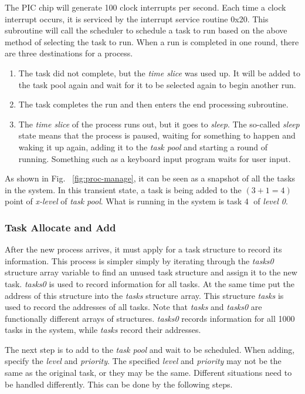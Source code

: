\documentclass{swfcthesis}
\begin{document}
The PIC chip will generate 100 clock interrupts per second. Each time a clock interrupt
occurs, it is serviced by the interrupt service routine 0x20. This subroutine will call
the scheduler to schedule a task to run based on the above method of selecting the task to
run. When a run is completed in one round, there are three destinations for a process.
\begin{enumerate}
\item The task did not complete, but the \emph{time slice} was used up. It will be added
  to the task pool again and wait for it to be selected again to begin another run.
\item The task completes the run and then enters the end processing subroutine.
\item The \emph{time slice} of the process runs out, but it goes to \emph{sleep}. The
  so-called \emph{sleep} state means that the process is paused, waiting for something to
  happen and waking it up again, adding it to the \emph{task pool} and starting a round of
  running. Something such as a keyboard input program waits for user input.
  
\end{enumerate}

As shown in Fig. ~\ref{fig:proc-manage}, it can be seen as a snapshot of all the tasks in
the system. In this transient state, a task is being added to the $(3+1=4)$ point of
\emph{x-level} of \emph{task pool}. What is running in the system is task \textcircled{4}
of \emph{level 0}. 


\subsubsection{Task Allocate and Add}
\label{sec:task-allocate-add}
After the new process arrives, it must apply for a task structure to record its
information. This process is simpler simply by iterating through the \emph{tasks0} structure array
variable to find an unused task structure and assign it to the new task. \emph{tasks0} is
used to record information for all tasks. At the same time put the address of this
structure into the \emph{tasks} structure array. This structure \emph{tasks} is used to
record the addresses of all tasks. Note that \emph{tasks} and \emph{tasks0} are
functionally different arrays of structures. \emph{tasks0} records information for all
1000 tasks in the system, while \emph{tasks} record their addresses.


The next step is to add to the \emph{task pool} and wait to be scheduled. When adding,
specify the \emph{level} and \emph{priority}. The specified \emph{level} and
\emph{priority} may not be the same as the original task, or they may be the
same. Different situations need to be handled differently. This can be done by the
following steps.
\end{document}
